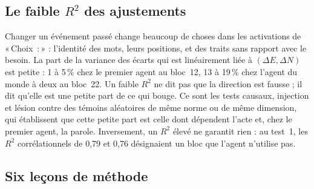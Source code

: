 \documentclass[11pt,a4paper]{article}
\newcommand{\Choix}{«\,Choix~:\,»}
\begin{document}
\subsection{Le faible \texorpdfstring{$R^2$}{R2} des ajustements}
\label{sec-r2}

Changer un événement passé change beaucoup de choses dans les activations de
\Choix{} : l'identité des mots, leurs positions, et des traits sans rapport avec le
besoin. La part de la variance des écarts qui est linéairement liée à $(\Delta E,
\Delta N)$ est petite : 1 à 5\,\% chez le premier agent au bloc~12, 13 à 19\,\% chez
l'agent du monde à deux au bloc~22. Un faible $R^2$ ne dit pas que la direction est
fausse ; il dit qu'elle est une petite part de ce qui bouge. Ce sont les tests
causaux, injection et lésion contre des témoins aléatoires de même norme ou de même
dimension, qui établissent que cette petite part est celle dont dépendent l'acte et,
chez le premier agent, la parole. Inversement, un $R^2$ élevé ne garantit rien : au
test~1, les $R^2$ corrélationnels de 0,79 et 0,76 désignaient un bloc que l'agent
n'utilise pas.

\subsection{Six leçons de méthode}
\label{sec-lecons}
\end{document}

